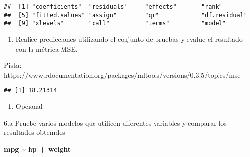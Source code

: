 \documentclass[]{article}
\newenvironment{Shaded}{\begin{snugshade}}{\end{snugshade}}
\newcommand{\CommentTok}[1]{\textcolor[rgb]{0.56,0.35,0.01}{\textit{#1}}}
\newcommand{\DataTypeTok}[1]{\textcolor[rgb]{0.13,0.29,0.53}{#1}}
\newcommand{\KeywordTok}[1]{\textcolor[rgb]{0.13,0.29,0.53}{\textbf{#1}}}
\newcommand{\NormalTok}[1]{#1}
\newcommand{\OperatorTok}[1]{\textcolor[rgb]{0.81,0.36,0.00}{\textbf{#1}}}
\newcommand{\StringTok}[1]{\textcolor[rgb]{0.31,0.60,0.02}{#1}}
\providecommand{\tightlist}{%
  \setlength{\itemsep}{0pt}\setlength{\parskip}{0pt}}
\begin{document}
\begin{verbatim}
##  [1] "coefficients"  "residuals"     "effects"       "rank"         
##  [5] "fitted.values" "assign"        "qr"            "df.residual"  
##  [9] "xlevels"       "call"          "terms"         "model"
\end{verbatim}

\begin{enumerate}
\def\labelenumi{\arabic{enumi}.}
\setcounter{enumi}{4}
\tightlist
\item
  Realice predicciones utilizando el conjunto de pruebas y evalue el
  resultado con la métrica MSE.
\end{enumerate}

Pista:
\url{https://www.rdocumentation.org/packages/mltools/versions/0.3.5/topics/mse}

\begin{Shaded}
\end{Shaded}

\begin{verbatim}
## [1] 18.21314
\end{verbatim}

\begin{enumerate}
\def\labelenumi{\arabic{enumi}.}
\setcounter{enumi}{5}
\tightlist
\item
  Opcional
\end{enumerate}

6.a Pruebe varios modelos que utilicen diferentes variables y comparar
los resultados obtenidos

\textbf{mpg \textasciitilde{} hp + weight}

\begin{Shaded}
\end{Shaded}
\end{document}
